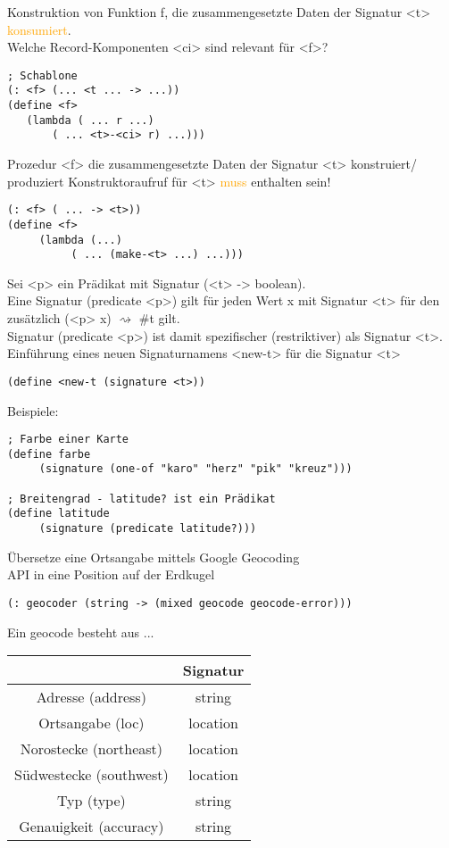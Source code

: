\documentclass[paper=a4, fontsize=11pt]{scrartcl}
\numberwithin{equation}{section}
\numberwithin{figure}{section}
\numberwithin{table}{section}
\begin{document}
Konstruktion von Funktion f, die zusammengesetzte Daten der Signatur <t> \textcolor{orange}{konsumiert}. \\
Welche Record-Komponenten <ci> sind relevant für <f>? \\
\begin{lstlisting}
; Schablone
(: <f> (... <t ... -> ...))
(define <f>
   (lambda ( ... r ...) 
       ( ... <t>-<ci> r) ...)))
\end{lstlisting}

Prozedur <f> die zusammengesetzte Daten der Signatur <t> konstruiert/ produziert Konstruktoraufruf  für <t> \textcolor{orange}{muss} enthalten sein! 
\begin{lstlisting}
(: <f> ( ... -> <t>))
(define <f>
     (lambda (...)
          ( ... (make-<t> ...) ...)))
\end{lstlisting}

Sei <p> ein Prädikat mit Signatur (<t> -> boolean). \\ 
Eine Signatur (predicate <p>)  gilt für jeden Wert x mit Signatur <t> für den zusätzlich (<p> x) $\rightsquigarrow$ \#t gilt. \\
Signatur (predicate <p>) ist damit spezifischer (restriktiver) als Signatur <t>. \\
Einführung eines neuen Signaturnamens <new-t> für die Signatur <t>
\begin{lstlisting}
(define <new-t (signature <t>))
\end{lstlisting}
Beispiele:
\begin{lstlisting}
; Farbe einer Karte
(define farbe
     (signature (one-of "karo" "herz" "pik" "kreuz")))
     
; Breitengrad - latitude? ist ein Prädikat
(define latitude
     (signature (predicate latitude?)))     
\end{lstlisting}

Übersetze eine Ortsangabe mittels Google Geocoding \\
API in eine Position auf der Erdkugel 
\begin{lstlisting}
(: geocoder (string -> (mixed geocode geocode-error)))
\end{lstlisting}
Ein geocode besteht aus ... \\
\begin{tabular}{|c|c|}
\hline
 & Signatur \\\hline
Adresse (address) & string \\
Ortsangabe (loc) & location \\
Norostecke (northeast) & location \\
Südwestecke (southwest) & location \\
Typ (type) & string \\
Genauigkeit (accuracy) & string \\\hline 
\end{tabular}
\end{document}
